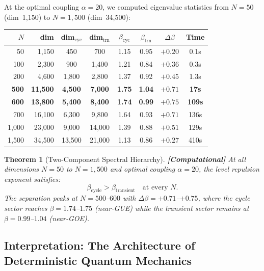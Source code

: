 \documentclass[12pt,a4paper]{article}
\newcommand{\computational}[1]{\textcolor{computational}{\textbf{[Computational]}} #1}
\newtheorem{theorem}{Theorem}[section]
\theoremstyle{definition}
\theoremstyle{remark}
\begin{document}
At the optimal coupling $\alpha = 20$, we computed eigenvalue statistics from
$N = 50$ (dim~1{,}150) to $N = 1{,}500$ (dim~34{,}500):

\begin{center}
\begin{tabular}{rrcccccc}
\toprule
$N$ & dim & dim$_{\text{cyc}}$ & dim$_{\text{trn}}$ & $\beta_{\text{cyc}}$ & $\beta_{\text{trn}}$ & $\Delta\beta$ & Time \\
\midrule
50 & 1{,}150 & 450 & 700 & 1.15 & 0.95 & $+0.20$ & 0.1s \\
100 & 2{,}300 & 900 & 1{,}400 & 1.21 & 0.84 & $+0.36$ & 0.3s \\
200 & 4{,}600 & 1{,}800 & 2{,}800 & 1.37 & 0.92 & $+0.45$ & 1.3s \\
\textbf{500} & \textbf{11{,}500} & \textbf{4{,}500} & \textbf{7{,}000} & \textbf{1.75} & \textbf{1.04} & $\mathbf{+0.71}$ & \textbf{17s} \\
\textbf{600} & \textbf{13{,}800} & \textbf{5{,}400} & \textbf{8{,}400} & \textbf{1.74} & \textbf{0.99} & $\mathbf{+0.75}$ & \textbf{109s} \\
700 & 16{,}100 & 6{,}300 & 9{,}800 & 1.64 & 0.93 & $+0.71$ & 136s \\
1{,}000 & 23{,}000 & 9{,}000 & 14{,}000 & 1.39 & 0.88 & $+0.51$ & 129s \\
1{,}500 & 34{,}500 & 13{,}500 & 21{,}000 & 1.13 & 0.86 & $+0.27$ & 410s \\
\bottomrule
\end{tabular}
\end{center}

\begin{theorem}[Two-Component Spectral Hierarchy]
\label{thm:hierarchy}
\computational{At all dimensions $N = 50$ to $N = 1{,}500$ and optimal coupling
$\alpha = 20$, the level repulsion exponent satisfies:}
\begin{equation}
  \beta_{\text{cycle}} > \beta_{\text{transient}} \quad \text{at every } N.
\end{equation}
The separation peaks at $N = 500$--$600$ with $\Delta\beta = +0.71$--$+0.75$,
where the cycle sector reaches $\beta = 1.74$--$1.75$ (near-GUE) while the
transient sector remains at $\beta = 0.99$--$1.04$ (near-GOE).
\end{theorem}

\subsection{Interpretation: The Architecture of Deterministic Quantum Mechanics}
\end{document}
